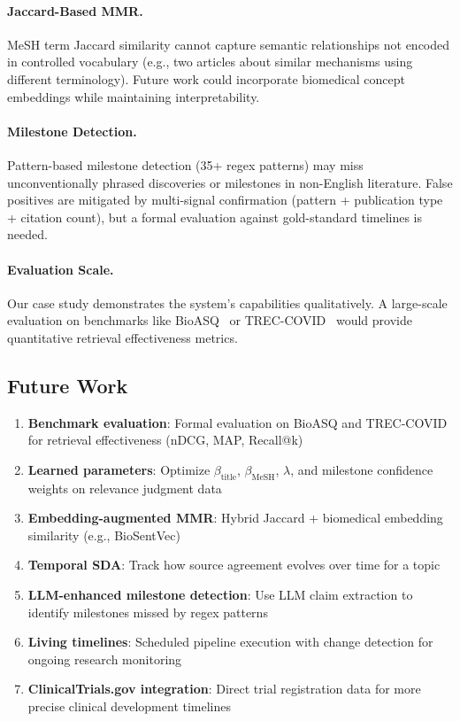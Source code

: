 \documentclass[11pt,a4paper]{article}
\begin{document}
\paragraph{Jaccard-Based MMR.}
MeSH term Jaccard similarity cannot capture semantic relationships not encoded in controlled vocabulary (e.g., two articles about similar mechanisms using different terminology).
Future work could incorporate biomedical concept embeddings while maintaining interpretability.

\paragraph{Milestone Detection.}
Pattern-based milestone detection (35+ regex patterns) may miss unconventionally phrased discoveries or milestones in non-English literature.
False positives are mitigated by multi-signal confirmation (pattern + publication type + citation count), but a formal evaluation against gold-standard timelines is needed.

\paragraph{Evaluation Scale.}
Our case study demonstrates the system's capabilities qualitatively.
A large-scale evaluation on benchmarks like BioASQ~\citep{tsatsaronis2015bioasq} or TREC-COVID~\citep{roberts2021trec} would provide quantitative retrieval effectiveness metrics.

\subsection{Future Work}

\begin{enumerate}
    \item \textbf{Benchmark evaluation}: Formal evaluation on BioASQ and TREC-COVID for retrieval effectiveness (nDCG, MAP, Recall@k)
    \item \textbf{Learned parameters}: Optimize $\beta_{\text{title}}$, $\beta_{\text{MeSH}}$, $\lambda$, and milestone confidence weights on relevance judgment data
    \item \textbf{Embedding-augmented MMR}: Hybrid Jaccard + biomedical embedding similarity (e.g., BioSentVec)
    \item \textbf{Temporal SDA}: Track how source agreement evolves over time for a topic
    \item \textbf{LLM-enhanced milestone detection}: Use LLM claim extraction to identify milestones missed by regex patterns
    \item \textbf{Living timelines}: Scheduled pipeline execution with change detection for ongoing research monitoring
    \item \textbf{ClinicalTrials.gov integration}: Direct trial registration data for more precise clinical development timelines
\end{enumerate}
\end{document}

